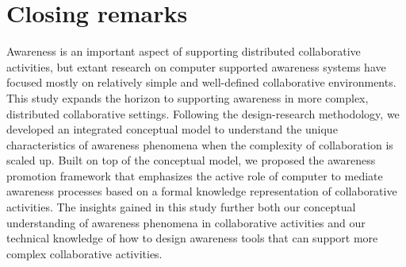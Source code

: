 \section{Closing remarks} %
\label{sec:closing_remarks}
Awareness is an important aspect of supporting distributed collaborative activities, but extant research on computer supported awareness systems have focused mostly on relatively simple and well-defined collaborative environments. This study expands the horizon to supporting awareness in more complex, distributed collaborative settings. Following the design-research methodology, we developed an integrated conceptual model to understand the unique characteristics of awareness phenomena when the complexity of collaboration is scaled up. Built on top of the conceptual model, we proposed the awareness promotion framework that emphasizes the active role of computer to mediate awareness processes based on a formal knowledge representation of collaborative activities. The insights gained in this study further both our conceptual understanding of awareness phenomena in collaborative activities and our technical knowledge of how to design awareness tools that can support more complex collaborative activities.




 

